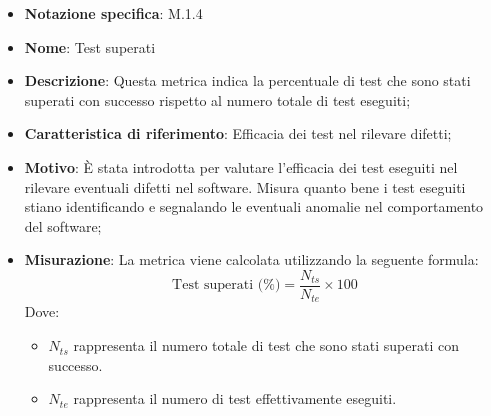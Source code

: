 \begin{itemize}
    \item \textbf{Notazione specifica}: M.1.4
    \item \textbf{Nome}: Test superati
    \item \textbf{Descrizione}: Questa metrica indica la percentuale di test che sono stati superati con successo rispetto al numero totale di test eseguiti;
    \item \textbf{Caratteristica di riferimento}: Efficacia dei test nel rilevare difetti;
    \item \textbf{Motivo}: È stata introdotta per valutare l'efficacia dei test eseguiti nel rilevare eventuali difetti nel software. Misura quanto bene i test eseguiti stiano identificando e segnalando le eventuali anomalie nel comportamento del software;
    \item \textbf{Misurazione}: La metrica viene calcolata utilizzando la seguente formula:
    \[
    \text{Test superati (\%)} = \frac{N_{ts}}{N_{te}} \times 100
    \]
    Dove:
    \begin{itemize}
        \item $N_{ts}$ rappresenta il numero totale di test che sono stati superati con successo.
        \item $N_{te}$ rappresenta il numero di test effettivamente eseguiti.
    \end{itemize}

\end{itemize}
